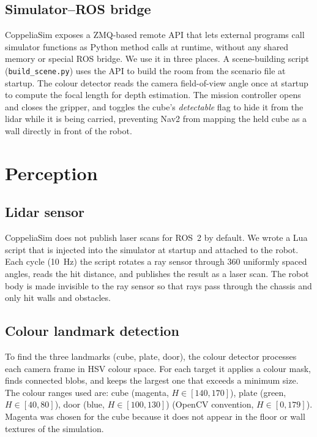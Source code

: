 \documentclass[conference]{IEEEtran}
\begin{document}
\subsection{Simulator--ROS bridge}

CoppeliaSim exposes a ZMQ-based remote API that lets external programs
call simulator functions as Python method calls at runtime, without
any shared memory or special ROS bridge.
We use it in three places.
A scene-building script (\texttt{build\_scene.py}) uses the API to
build the room from the scenario file at startup.
The colour detector reads the camera field-of-view angle once at
startup to compute the focal length for depth estimation.
The mission controller opens and closes the gripper, and toggles
the cube's \emph{detectable} flag to hide it from the lidar while it
is being carried, preventing Nav2 from mapping the held cube as a
wall directly in front of the robot.


\section{Perception}
\label{sec:perception}

\subsection{Lidar sensor}

CoppeliaSim does not publish laser scans for ROS~2 by default.
We wrote a Lua script that is injected into the simulator at startup
and attached to the robot.
Each cycle (10~Hz) the script rotates a ray sensor through 360
uniformly spaced angles, reads the hit distance, and publishes
the result as a laser scan.
The robot body is made invisible to the ray sensor so that rays
pass through the chassis and only hit walls and obstacles.

\subsection{Colour landmark detection}

To find the three landmarks (cube, plate, door), the colour detector
processes each camera frame in HSV colour space.
For each target it applies a colour mask, finds connected blobs, and
keeps the largest one that exceeds a minimum size.
The colour ranges used are: cube (magenta, $H \in [140,170]$),
plate (green, $H \in [40,80]$), door (blue, $H \in [100,130]$)
(OpenCV convention, $H \in [0,179]$).
Magenta was chosen for the cube because it does not appear in the
floor or wall textures of the simulation.
\end{document}
